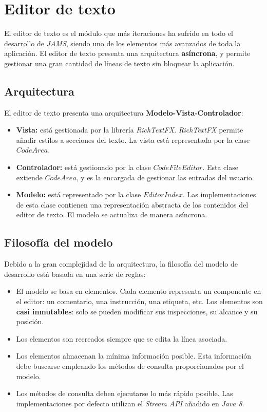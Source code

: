 \section{Editor de texto}\label{sec:editor-de-texto}

El editor de texto es el módulo que más iteraciones
ha sufrido en todo el desarrollo de \textit{JAMS},
siendo uno de los elementos más avanzados de toda
la aplicación.
El editor de texto presenta una arquitectura
\textbf{asíncrona}, y permite gestionar una gran
cantidad de líneas de texto sin bloquear la aplicación.

\subsection{Arquitectura}\label{subsec:arquitectura}

El editor de texto presenta una arquitectura
\textbf{Modelo-Vista-Controlador}:
\begin{itemize}
    \item \textbf{Vista:} está gestionada
    por la librería \textit{RichTextFX}\cite{RICH_TEXT_FX}.
    \textit{RichTextFX} permite añadir estilos
    a secciones del texto.
    La vista está representada por la clase
    $CodeArea$.
    \item \textbf{Controlador:} está
    gestionado por la clase $CodeFileEditor$.
    Esta clase extiende $CodeArea$, y es la
    encargada de gestionar las entradas del usuario.
    \item \textbf{Modelo:} está representado
    por la clase $EditorIndex$.
    Las implementaciones de esta clase contienen
    una representación abstracta de los contenidos
    del editor de texto.
    El modelo se actualiza de manera asíncrona.
\end{itemize}

\subsection{Filosofía del modelo}\label{subsec:filosofía-del-modelo}


Debido a la gran complejidad de la arquitectura,
la filosofía del modelo de desarrollo está basada en una serie de reglas:
\begin{itemize}
    \item El modelo se basa en elementos.
    Cada elemento representa un componente en el editor:
    un comentario, una instrucción, una etiqueta, etc.
    Los elementos son \textbf{casi inmutables}:
    solo se pueden modificar sus inspecciones, su alcance y su posición.
    \item Los elementos son recreados siempre que se edita la línea asociada.
    \item Los elementos almacenan la mínima información posible.
    Esta información debe buscarse empleando los métodos
    de consulta proporcionados por el modelo.
    \item Los métodos de consulta deben ejecutarse lo más rápido
    posible.
    Las implementaciones por defecto utilizan el
    \textit{Stream API}\cite{STREAM_API} añadido en \textit{Java 8}.
\end{itemize}

